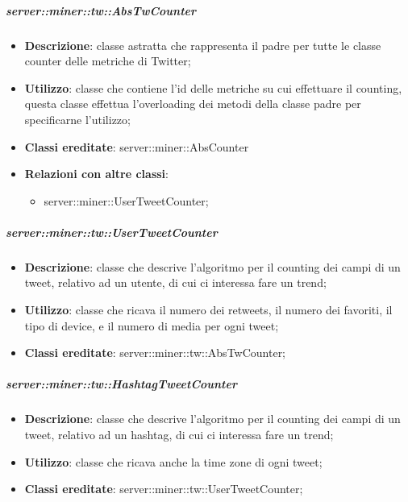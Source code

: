 	\subparagraph{server::miner::tw::AbsTwCounter} %
		\label{subp:server_miner_tw_AbsTwCounter}
			\begin{itemize}
				\item \textbf{Descrizione}: classe astratta che rappresenta il padre per tutte le classe counter delle metriche di Twitter;
				\item \textbf{Utilizzo}: classe che contiene l’id delle metriche su cui effettuare il counting, questa classe effettua l’overloading dei metodi della classe padre per specificarne l’utilizzo;
				\item \textbf{Classi ereditate}: server::miner::AbsCounter
				\item \textbf{Relazioni con altre classi}:
					\begin{itemize}
						\item server::miner::UserTweetCounter;
					\end{itemize}
			\end{itemize}

	\subparagraph{server::miner::tw::UserTweetCounter} %
		\label{subp:server_miner_tw_UserTweetCounter}
			\begin{itemize}
				\item \textbf{Descrizione}: classe che descrive l'algoritmo per il counting dei campi di un tweet, relativo ad un utente, di cui ci interessa fare un trend;
				\item \textbf{Utilizzo}: classe che ricava il numero dei retweets, il numero dei favoriti, il tipo di device, e il numero di media per ogni tweet;
				\item \textbf{Classi ereditate}: server::miner::tw::AbsTwCounter;
			\end{itemize}


	\subparagraph{server::miner::tw::HashtagTweetCounter} %
		\label{subp:server_miner_tw_HashtagTweetCounter}
			\begin{itemize}
				\item \textbf{Descrizione}: classe che descrive l'algoritmo per il counting dei campi di un tweet, relativo ad un hashtag, di cui ci interessa fare un trend;
				\item \textbf{Utilizzo}: classe che ricava anche la time zone di ogni tweet;
				\item \textbf{Classi ereditate}: server::miner::tw::UserTweetCounter;
			\end{itemize}

